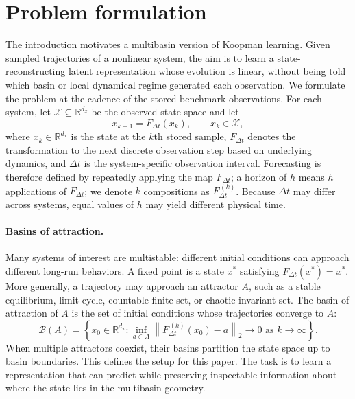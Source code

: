 \documentclass[11pt]{article}
\newcommand{\R}{\mathbb{R}}
\newcommand{\norm}[1]{\left\lVert #1 \right\rVert}
\begin{document}
\section{Problem formulation}
\label{sec:problem}

The introduction motivates a multibasin version of Koopman learning. Given sampled trajectories of a nonlinear system, the aim is to learn a state-reconstructing latent representation whose evolution is linear, without being told which basin or local dynamical regime generated each observation.
We formulate the problem at the cadence of the stored benchmark observations.
For each system, let \(\mathcal X\subseteq\R^{d_x}\) be the observed state space and let
\begin{equation}
    x_{k+1}=F_{\Delta t}(x_k),\qquad x_k\in\mathcal X,
    \label{eq:sampled_map}
\end{equation}
where $x_k\in\R^{d_x}$ is the state at the $k$th stored sample, $F_{\Delta t}$ denotes the transformation to the next discrete observation step based on underlying dynamics, and $\Delta t$ is the system-specific observation interval.
Forecasting is therefore defined by repeatedly applying the map $F_{\Delta t}$; a horizon of $h$ means $h$ applications of $F_{\Delta t}$; we denote $k$ compositions as $F_{\Delta t}^{\,(k)}$. Because $\Delta t$ may differ across systems, equal values of $h$ may yield different physical time.

\paragraph{Basins of attraction.} Many systems of interest are multistable: different initial conditions can approach different long-run behaviors.
A fixed point is a state $x^\ast$ satisfying $F_{\Delta t}(x^\ast)=x^\ast$.
More generally, a trajectory may approach an attractor $A$, such as a stable equilibrium, limit cycle, countable finite set, or chaotic invariant set.
The basin of attraction of $A$ is the set of initial conditions whose trajectories converge to $A$:
\begin{equation}
  \mathcal{B}(A)
  =
  \left\{
    x_0\in\R^{d_x}:
    \inf_{a\in A}\norm{F_{\Delta t}^{\,(k)}(x_0)-a}_2\!\to 0
    \text{ as } k\to\infty
  \right\}.
  \label{eq:basin}
\end{equation}
When multiple attractors coexist, their basins partition the state space up to basin boundaries. This defines the setup for this paper.
The task is to learn a representation that can predict while preserving inspectable information about where the state lies in the multibasin geometry.
\end{document}
